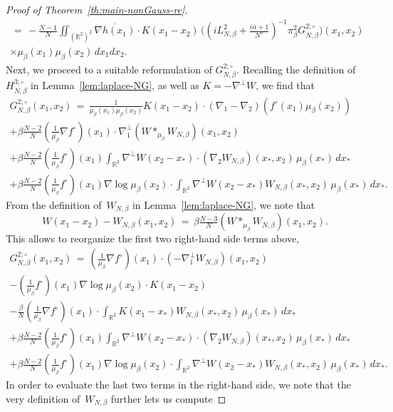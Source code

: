 \documentclass[a4paper,11pt,reqno,noindent]{amsart}
\theoremstyle{plain}
\numberwithin{equation}{section}
\newcommand{\R}{\mathbb R}
\newcommand{\3}{|\!|\!|}
\begin{document}
\begin{proof}[Proof of Theorem~\ref{th:main-nonGauss-re}]
\begin{multline}
\,=\,-\tfrac{N-1}N\iint_{(\R^2)^2}\overline{\nabla h(x_1)}\cdot K(x_1-x_2)\,\big((iL_{N,\beta}^2+\tfrac{i\alpha+1}{N^\sigma})^{-1}\pi_\beta^2 G_{N,\beta}^{2;\circ}\big)(x_1,x_2)\\
\times\mu_\beta(x_1)\mu_\beta(x_2)\, dx_1dx_2.
\end{multline}
Next, we proceed to a suitable reformulation of $G_{N,\beta}^{2;\circ}$.
Recalling the definition of $H^{3;\circ}_{N,\beta}$ in Lemma~\ref{lem:laplace-NG},
as well as $K=-\nabla^\bot W$,
we find that
\begin{multline*}
G_{N,\beta}^{2;\circ}(x_1,x_2)\,=\,\tfrac{1}{\mu_\beta(x_1)\mu_\beta(x_2)}K(x_1-x_2)\cdot(\nabla_1-\nabla_2)(f^\circ(x_1)\mu_\beta(x_2))\\
+\beta\tfrac{N-2}N(\tfrac1{\mu_\beta}\nabla f^\circ)(x_1)\cdot\nabla^\bot_1(W\ast_{\mu_\beta}W_{N,\beta})(x_1,x_2)\\
+\beta\tfrac{N-2}N(\tfrac1{\mu_\beta}f^\circ)(x_1)\int_{\R^2}\nabla^\bot W(x_2-x_*)\cdot(\nabla_2W_{N,\beta})(x_*,x_2)\,\mu_\beta(x_*)\,dx_*\\
+\beta\tfrac{N-2}N(\tfrac1{\mu_\beta}f^\circ)(x_1)\nabla\log\mu_\beta(x_2)\cdot \int_{\R^2}\nabla^\bot W(x_2-x_*)W_{N,\beta}(x_*,x_2)\,\mu_\beta(x_*)\,dx_*.
\end{multline*}
From the definition of~$W_{N,\beta}$ in Lemma~\ref{lem:laplace-NG}, we note that
\[W(x_1-x_2)-W_{N,\beta}(x_1,x_2)\,=\,\beta\tfrac{N-3}N(W\ast_{\mu_\beta}W_{N,\beta})(x_1,x_2).\]
This allows to reorganize the first two right-hand side terms above,
\begin{multline}\label{eq:GNbeta-rewr}
G_{N,\beta}^{2;\circ}(x_1,x_2)\,=\,
(\tfrac1{\mu_\beta}\nabla f^\circ)(x_1)\cdot(-\nabla^\bot_1W_{N,\beta})(x_1,x_2)\\
-(\tfrac{1}{\mu_\beta}f^\circ)(x_1)\nabla\log\mu_\beta(x_2)\cdot K(x_1-x_2)\\
-\tfrac{\beta}{N}(\tfrac{1}{\mu_\beta}\nabla f^\circ)(x_1)\cdot\int_{\R^2}K(x_1-x_*)W_{N,\beta}(x_*,x_2)\,\mu_\beta(x_*)\,dx_*\\
+\beta\tfrac{N-2}N(\tfrac{1}{\mu_\beta}f^\circ)(x_1)\int_{\R^2}\nabla^\bot W(x_2-x_*)\cdot(\nabla_2W_{N,\beta})(x_*,x_2)\,\mu_\beta(x_*)\,dx_*\\
+\beta\tfrac{N-2}N(\tfrac{1}{\mu_\beta}f^\circ)(x_1)\nabla\log\mu_\beta(x_2)\cdot \int_{\R^2}\nabla^\bot W(x_2-x_*)W_{N,\beta}(x_*,x_2)\,\mu_\beta(x_*)\,dx_*.
\end{multline}
In order to evaluate the last two terms in the right-hand side, we note that the very definition of~$W_{N,\beta}$ further lets us compute

\end{proof}
\end{document}
